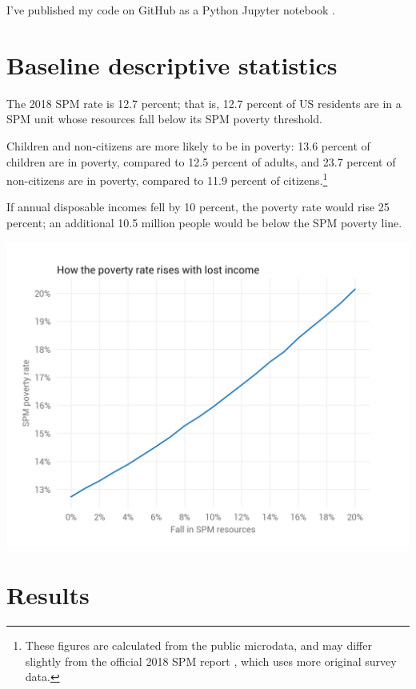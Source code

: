 \documentclass[12pt]{article}
\begin{document}
I've published my code on GitHub as a Python Jupyter notebook \cite{notebook}.


\section{Baseline descriptive statistics} \label{sec:baseline_descriptive_statistics}

The 2018 SPM rate is 12.7 percent; that is, 12.7 percent of US residents are in a SPM unit whose resources fall below its SPM poverty threshold.

Children and non-citizens are more likely to be in poverty: 13.6 percent of children are in poverty, compared to 12.5 percent of adults, and 23.7 percent of non-citizens are in poverty, compared to 11.9 percent of citizens.\footnote{These figures are calculated from the public microdata, and may differ slightly from the official 2018 SPM report \cite{spm}, which uses more original survey data.}

If annual disposable incomes fell by 10 percent, the poverty rate would rise 25 percent; an additional 10.5 million people would be below the SPM poverty line.

\begin{center}
\includegraphics[width=15cm]{../charts/pov_rate_income.png}
\label{fig:pov_rate_income}
\end{center}


\section{Results} \label{sec:results}
\end{document}
